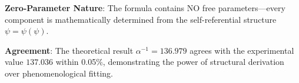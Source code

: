 \documentclass[%
 reprint,
 amsmath,amssymb,
 aps,
 prd,
 10pt,
 nofootinbib,      %
 longbibliography  %
]{revtex4-2}
\theoremstyle{definition}
\theoremstyle{remark}
\begin{document}
\textbf{Zero-Parameter Nature}: The formula contains NO free parameters---every component
is mathematically determined from the self-referential structure $\psi = \psi(\psi)$.

\textbf{Agreement}: The theoretical result $\alpha^{-1} = 136.979$ agrees with
the experimental value $137.036$ within 0.05\%, demonstrating the power of
structural derivation over phenomenological fitting.
\end{document}
